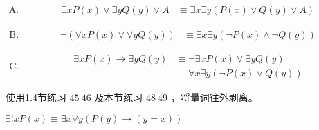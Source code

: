 {{        %
        \begin{practices}
            \begin{enumerate}[A.]
                \item
                {
                    \begin{align*}
                        \exists x P(x) \vee \exists y Q(y) \vee A
                        &\equiv \exists x \exists y (P(x) \vee Q(y) \vee A)
                    \end{align*}
                }
                \item
                {
                    \begin{align*}
                        \neg (\forall x P(x) \vee \forall y Q(y))
                        &\equiv \exists x \exists y (\neg P(x) \wedge \neg Q(y))
                    \end{align*}
                }
                \item
                {
                    \begin{align*}
                        \exists x P(x) \rightarrow \exists y Q(y)
                        &\equiv \neg \exists x P(x) \vee \exists y Q(y) \\
                        &\equiv \forall x \exists y (\neg P(x) \vee Q(y))
                    \end{align*}
                }
            \end{enumerate}
        \end{practices}

        \begin{practices}
            使用1.4节练习 $45~46$ 及本节练习 $48~49$ ，将量词往外剥离。
        \end{practices}

        \begin{practices}
             $\exists !x P(x) \equiv \exists x \forall y (P(y) \rightarrow (y = x))$
        \end{practices}
    }
}
